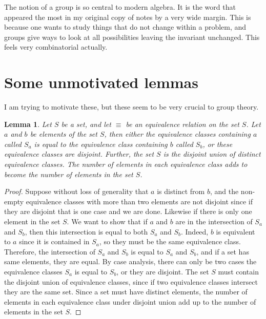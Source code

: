 \documentclass{tufte-book}
\newtheorem{lemma}[theorem]{Lemma}
\begin{document}
The notion of a group is so central to modern algebra. It is the word that appeared the most in my original copy of notes by a very wide margin. This is because one wants to study things that do not change within a problem, and groups give ways to look at all possibilities leaving the invariant unchanged. This feels very combinatorial actually.

\section{Some unmotivated lemmas}

I am trying to motivate these, but these seem to be very crucial to group theory.

\begin{lemma}
  Let $S$ be a set, and let $\equiv$ be an equivalence relation on the set $S$.
  Let $a$ and $b$ be elements of the set $S$, then either 
  the equivalence classes containing $a$ called $S_{a}$ is equal to the 
  equivalence class containing $b$ called $S_{b}$, or these equivalence classes are disjoint.
  Further, the set $S$ is the disjoint union of distinct equivalence classes.
  The number of elements in each equivalence class adds to become the number of elements in the set $S$.
\end{lemma}

\begin{proof}
  Suppose without loss of generality that $a$ is distinct from $b$, and the non-empty equivalence classes
  with more than two elements are not disjoint since if they are disjoint that is one case and we are done.
  Likewise if there is only one element in the set $S$.
  We want to show that if $a$ and $b$ are in the intersection of $S_{a}$ and $S_{b}$, then this intersection is equal to
  both $S_a$ and $S_b$. Indeed, $b$ is equivalent to $a$ since it is contained in $S_a$, so they must be the same equivalence class.
  Therefore, the intersection of $S_{a}$ and $S_{b}$ is equal to $S_a$ and $S_b$, and if a set has same elements, they are equal.
  By case analysis, there can only be two cases the equivalence classes $S_a$ is equal to $S_b$, or they are disjoint.
  The set $S$ must contain the disjoint union of equivalence classes, since if two equivalence classes intersect they are the same set.
  Since a set must have distinct elements, the number of elements in each equivalence class under disjoint union add up to the number of elements in the set $S$.
\end{proof}
\end{document}
